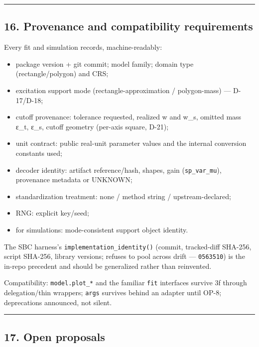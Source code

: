 \documentclass[
  10pt,
]{article}
\providecommand{\tightlist}{%
  \setlength{\itemsep}{0pt}\setlength{\parskip}{0pt}}
\begin{document}
\begin{center}\rule{0.5\linewidth}{0.5pt}\end{center}

\hypertarget{provenance-and-compatibility-requirements}{%
\subsection{16. Provenance and compatibility requirements}\label{provenance-and-compatibility-requirements}}

Every fit and simulation records, machine-readably:

\begin{itemize}
\tightlist
\item
  package version + git commit; model family; domain type (rectangle/polygon) and CRS;
\item
  excitation support mode (rectangle-approximation / polygon-mass) --- D-17/D-18;
\item
  cutoff provenance: tolerance requested, realized w and w\_s, omitted mass ε\_t, ε\_s, cutoff geometry (per-axis square, D-21);
\item
  unit contract: public real-unit parameter values and the internal conversion constants used;
\item
  decoder identity: artifact reference/hash, shapes, gain (\texttt{sp\_var\_mu}), provenance metadata or UNKNOWN;
\item
  standardization treatment: none / method string / upstream-declared;
\item
  RNG: explicit key/seed;
\item
  for simulations: mode-consistent support object identity.
\end{itemize}

The SBC harness's \texttt{implementation\_\allowbreak{}identity()} (commit, tracked-diff SHA-256, script SHA-256, library versions; refuses to pool across drift --- \texttt{0563510}) is the in-repo precedent and should be generalized rather than reinvented.

Compatibility: \texttt{model.plot\_*} and the familiar \texttt{fit} interfaces survive 3f through delegation/thin wrappers; \texttt{args} survives behind an adapter until OP-8; deprecations announced, not silent.

\begin{center}\rule{0.5\linewidth}{0.5pt}\end{center}

\hypertarget{open-proposals}{%
\subsection{17. Open proposals}\label{open-proposals}}
\end{document}
